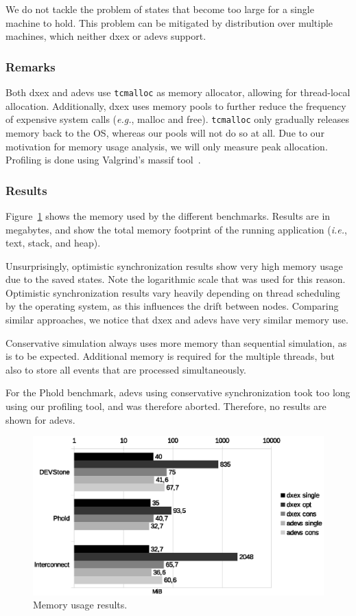 We do not tackle the problem of states that become too large for a single machine to hold.
This problem can be mitigated by distribution over multiple machines, which neither dxex or adevs support.

\subsubsection{Remarks}
Both dxex and adevs use \texttt{tcmalloc} as memory allocator, allowing for thread-local allocation.
Additionally, dxex uses memory pools to further reduce the frequency of expensive system calls (\textit{e.g.}, malloc and free).
\texttt{tcmalloc} only gradually releases memory back to the OS, whereas our pools will not do so at all.
Due to our motivation for memory usage analysis, we will only measure peak allocation.
Profiling is done using Valgrind's massif tool~\cite{Nethercote:2007:VFH:1273442.1250746}.

\subsubsection{Results}
Figure~\ref{fig:memory} shows the memory used by the different benchmarks.
Results are in megabytes, and show the total memory footprint of the running application (\textit{i.e.}, text, stack, and heap).

Unsurprisingly, optimistic synchronization results show very high memory usage due to the saved states.
Note the logarithmic scale that was used for this reason.
Optimistic synchronization results vary heavily depending on thread scheduling by the operating system, as this influences the drift between nodes.
Comparing similar approaches, we notice that dxex and adevs have very similar memory use.

Conservative simulation always uses more memory than sequential simulation, as is to be expected.
Additional memory is required for the multiple threads, but also to store all events that are processed simultaneously.

For the Phold benchmark, adevs using conservative synchronization took too long using our profiling tool, and was therefore aborted.
Therefore, no results are shown for adevs.

\begin{figure}
    \includegraphics[width=\columnwidth]{fig/memory_voorlopig.eps}
    \caption{Memory usage results.}
    \label{fig:memory}
\end{figure}

